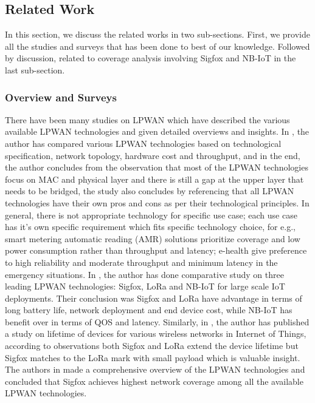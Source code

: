 \documentclass[12pt]{article}
\begin{document}


\subsection{Related Work}\label{related work}
In this section, we discuss the related works in two sub-sections. First, we provide all the studies and surveys that has been done to best of our knowledge. Followed by discussion, related to coverage analysis involving Sigfox and NB-IoT in the last sub-section.
\subsubsection{Overview and Surveys}
There have been many studies on LPWAN which have described the various available LPWAN technologies and given detailed overviews and insights. In \cite{raza2017low}, the author has compared various LPWAN technologies based on technological specification, network topology, hardware cost and throughput, and in the end, the author concludes from the observation that most of the LPWAN technologies focus on MAC and physical layer and there is still a gap at the upper layer that needs to be bridged, the study also concludes by referencing that all LPWAN technologies have their own pros and cons as per their technological principles. In general, there is not appropriate technology for specific use case; each use case has it's own specific requirement which fits specific technology choice, for e.g., smart metering automatic reading (AMR) solutions prioritize coverage and low power consumption rather than throughput and latency; e-health give preference to high reliability and moderate throughput and minimum latency in the emergency situations. In \cite{mekki2019comparative}, the author has done comparative study on three leading LPWAN technologies: Sigfox, LoRa and NB-IoT for large scale IoT deployments. Their conclusion was Sigfox and LoRa have advantage in terms of long battery life, network deployment and end device cost, while NB-IoT has benefit over in terms of QOS and latency. Similarly, in \cite{morin2017comparison}, the author has published a study on lifetime of devices for various wireless networks in Internet of Things, according to observations both Sigfox and LoRa extend the device lifetime but Sigfox matches to the LoRa mark with small payload which is valuable insight. The authors in \cite{mekki2018overview} made a comprehensive overview of the LPWAN technologies and concluded that Sigfox achieves highest network coverage among all the available LPWAN technologies.\par
\end{document}
